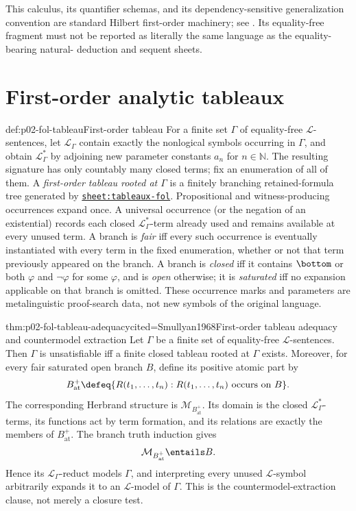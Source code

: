 This calculus, its quantifier schemas, and its dependency-sensitive
generalization convention are standard Hilbert first-order machinery; see
\cite{Mendelson1997,Enderton2001}.  Its equality-free fragment must not be
reported as literally the same language as the equality-bearing natural-
deduction and sequent sheets.

\section{First-order analytic tableaux}
\label{sec:p02-tableaux-fol}

\begin{hbdefinition}{def:p02-fol-tableau}{First-order tableau}
For a finite set \(\Gamma\) of equality-free \(\mathcal L\)-sentences, let
\(\mathcal L_{\Gamma}\) contain exactly the nonlogical symbols occurring in
\(\Gamma\), and obtain \(\mathcal L_{\Gamma}^*\) by adjoining new parameter
constants \(a_n\) for \(n\in\mathbb N\).  The resulting signature has only
countably many closed terms; fix an enumeration of all of them.  A
\emph{first-order tableau rooted at \(\Gamma\)}
is a finitely branching
retained-formula tree generated by
\hyperref[sheet:tableaux-fol]{\texttt{sheet:tableaux-fol}}.  Propositional
and witness-producing occurrences expand once.  A universal occurrence (or
the negation of an existential) records each closed
\(\mathcal L_{\Gamma}^*\)-term already used and remains available at every
unused term.  A branch is \emph{fair} iff every such occurrence is eventually
instantiated with every term in the fixed enumeration, whether or not that
term previously appeared on the branch.  A branch is \emph{closed} iff it
contains \(\bottom\) or
both \(\varphi\) and \(\neg\varphi\) for some \(\varphi\), and is \emph{open}
otherwise; it is \emph{saturated} iff no expansion applicable on that branch
is omitted.  These occurrence marks and parameters are
metalinguistic proof-search data, not new symbols of the original language.
\end{hbdefinition}

\begin{hbtheorem}{thm:p02-fol-tableau-adequacy}{cited=Smullyan1968}{First-order tableau adequacy and countermodel extraction}
Let \(\Gamma\) be a finite set of equality-free \(\mathcal L\)-sentences.
Then \(\Gamma\) is unsatisfiable iff a finite closed tableau rooted at
\(\Gamma\) exists.  Moreover, for every fair saturated open branch \(B\),
define its positive atomic part by
\[
 B^{+}_{\mathrm{at}}
 \defeq
 \{R(t_1,\ldots,t_n):R(t_1,\ldots,t_n)\text{ occurs on }B\}.
\]
The corresponding Herbrand structure is
\(\mathcal M_{B^{+}_{\mathrm{at}}}\).  Its domain is the closed
\(\mathcal L_{\Gamma}^*\)-terms, its functions act by term formation, and
its relations are exactly the members of \(B^{+}_{\mathrm{at}}\).
The branch truth induction gives
\[
 \mathcal M_{B^{+}_{\mathrm{at}}}\entails B.
\]
Hence its
\(\mathcal L_{\Gamma}\)-reduct models \(\Gamma\), and interpreting every
unused \(\mathcal L\)-symbol arbitrarily expands it to an
\(\mathcal L\)-model of \(\Gamma\).
This is the countermodel-extraction clause, not merely a closure test.
\end{hbtheorem}

